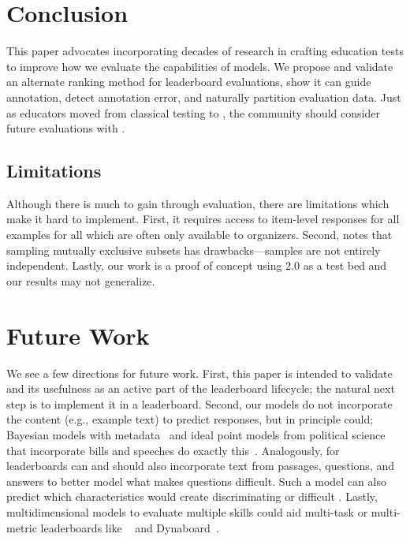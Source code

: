 \section{Conclusion}
\label{ch:isicle:conc}

This paper advocates incorporating decades of research in crafting education tests to improve how we evaluate the capabilities of  models.
We propose and validate an alternate \irt{} ranking method for leaderboard evaluations, show it can guide annotation, detect annotation error, and naturally partition evaluation data.
Just as educators moved from classical testing to \irt{}, the \nlp{} community should consider future evaluations with \irt{}.


\subsection{Limitations}
Although there is much to gain through \irt{} evaluation, there are limitations which make it hard to implement.
First, it requires access to item-level responses for all examples for all \subjs{} which are often only available to organizers.
Second, \citet{urbano2016reliability} notes that sampling mutually exclusive subsets has drawbacks---samples are not entirely independent.
Lastly, our work is a proof of concept using \squad{} 2.0 as a test bed and our results may not generalize.

\section{Future Work}
\label{ch:isicle:future}

We see a few directions for future work.
First, this paper is intended to validate \irt{} and its usefulness as an active part of the leaderboard lifecycle; the natural next step is to implement it in a leaderboard.
Second, our \irt{} models do not incorporate the \itm{} content (e.g., example text) to predict responses, but in principle could; Bayesian models with metadata~\citep{card2018meta} and ideal point models from political science~\citep{poole1985spatial} that incorporate bills and speeches do exactly this~\citep{gerrish2011text,nguyen2015tea,kraft2016vote}.
Analogously, \irt{} for leaderboards can and should also incorporate text from passages, questions, and answers to better model what makes questions difficult.
Such a model can also predict which characteristics would create discriminating or difficult \itms{}.
Lastly, multidimensional \irt{} models to evaluate multiple skills could aid multi-task or multi-metric leaderboards like ~\citep{fisch2019mrqa} and Dynaboard~\citep{ma2021dynaboard}.
